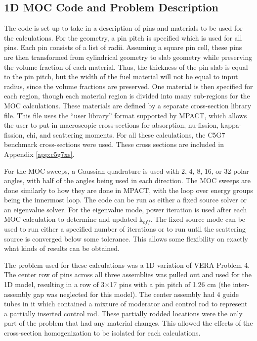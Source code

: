\subsection{1D MOC Code and Problem Description}

The code is set up to take in a description of pins and materials to be used for the calculations.  For the geometry, a pin pitch is specified which is used for all pins.  Each pin consists of a list of radii.  Assuming a square pin cell, these pins are then transformed from cylindrical geometry to slab geometry while preserving the volume fraction of each material.  Thus, the thickness of the pin slab is equal to the pin pitch, but the width of the fuel material will not be equal to input radius, since the volume fractions are preserved.  One material is then specified for each region, though each material region is divided into many sub-regions for the MOC calculations.  These materials are defined by a separate cross-section library file.  This file uses the ``user library'' format supported by MPACT, which allows the user to put in macroscopic cross-sections for absorption, nu-fission, kappa-fission, chi, and scattering moments.  For all these calculations, the C5G7 benchmark cross-sections \cite{EELewisC5G72003,EELewisC5G7extended2005} were used.  These cross sections are included in Appendix \ref{app:c5g7xs}.

For the MOC sweeps, a Gaussian quadrature \cite{HandbookOfMathFunctions1972} is used with 2, 4, 8, 16, or 32 polar angles, with half of the angles being used in each direction.  The MOC sweeps are done similarly to how they are done in MPACT, with the loop over energy groups being the innermost loop.  The code can be run as either a fixed source solver or an eigenvalue solver.  For the eigenvalue mode, power iteration is used after each MOC calculation to determine and updated k$_{eff}$.  The fixed source mode can be used to run either a specified number of iterations or to run until the scattering source is converged below some tolerance.  This allows some flexibility on exactly what kinds of results can be obtained.

The problem used for these calculations was a 1D variation of VERA Problem 4.  The center row of pins across all three assemblies was pulled out and used for the 1D model, resulting in a row of 3$\times$17 pins with a pin pitch of 1.26 cm (the inter-assembly gap was neglected for this model).  The center assembly had 4 guide tubes in it which contained a mixture of moderator and control rod to represent a partially inserted control rod.  These partially rodded locations were the only part of the problem that had any material changes.  This allowed the effects of the cross-section homogenization to be isolated for each calculations.

